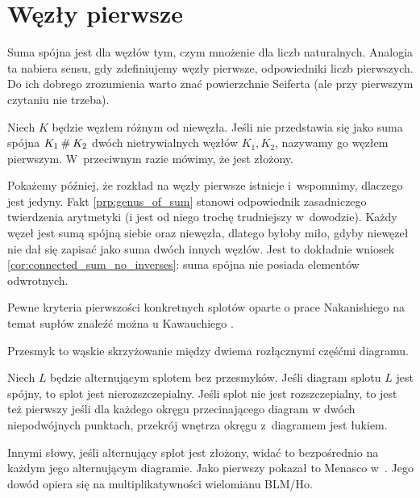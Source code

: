 
\section{Węzły pierwsze}
%
Suma spójna jest dla węzłów tym, czym mnożenie dla liczb naturalnych.
Analogia ta nabiera sensu, gdy zdefiniujemy węzły pierwsze, odpowiedniki liczb pierwszych.
Do ich dobrego zrozumienia warto znać powierzchnie Seiferta (ale przy pierwszym czytaniu nie trzeba).

\begin{definition}
\label{def:prime_knot}%
    Niech $K$ będzie węzłem różnym od niewęzła.
    Jeśli nie przedstawia się jako suma spójna $K_1 \mathbin{\#} K_2$ dwóch nietrywialnych węzłów $K_1, K_2$, nazywamy go węzłem pierwszym.
    W~przeciwnym razie mówimy, że jest złożony.
\end{definition}

Pokażemy później, że rozkład na węzły pierwsze istnieje i~wspomnimy, dlaczego jest jedyny.
Fakt \ref{prp:genus_of_sum} stanowi odpowiednik zasadniczego twierdzenia arytmetyki (i jest od niego trochę trudniejszy w~dowodzie).
Każdy węzeł jest sumą spójną siebie oraz niewęzła, dlatego byłoby miło, gdyby niewęzeł nie dał się zapisać jako suma dwóch innych węzłów.
Jest to dokładnie wniosek \ref{cor:connected_sum_no_inverses}: suma spójna nie posiada elementów odwrotnych.

Pewne kryteria pierwszości konkretnych splotów oparte o prace Nakanishiego na temat supłów znaleźć można u Kawauchiego \cite[s. 38-41]{kawauchi96}.

Przesmyk to wąskie skrzyżowanie między dwiema rozłącznymi częśćmi diagramu.
%

\begin{proposition}
%
    Niech $L$ będzie alternującym splotem bez przesmyków.
    Jeśli diagram splotu $L$ jest spójny, to splot jest nierozszczepialny.
    Jeśli splot nie jest rozszczepialny, to jest też pierwszy jeśli dla każdego okręgu przecinającego diagram w dwóch niepodwójnych punktach, przekrój wnętrza okręgu z~diagramem jest łukiem.
\end{proposition}

Innymi słowy, jeśli alternujący splot jest złożony, widać to bezpośrednio na każdym jego alternującym diagramie.
Jako pierwszy pokazał to Menasco w~\cite{menasco84}.
%
Jego dowód opiera się na multiplikatywności wielomianu BLM/Ho.
%

